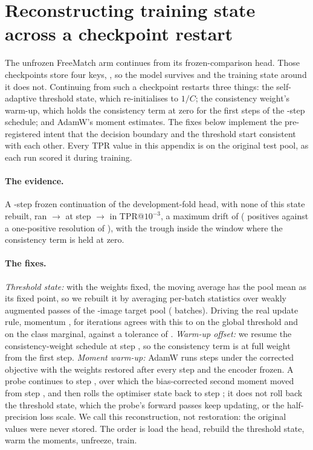 \section{Reconstructing training state across a checkpoint restart}
\label{sec:appendix-restart}

The unfrozen FreeMatch arm continues from its frozen-comparison head. Those checkpoints store
four keys, \restartKeys{}, so the model survives and the training state around it does not.
Continuing from such a checkpoint restarts three things: the self-adaptive threshold state,
which re-initialises to $1/C$; the consistency weight's warm-up, which holds the consistency term at
zero for the first \restartMuZeroSteps{} steps of the \restartScheduleStepsNs{}-step schedule;
and AdamW's moment estimates. The fixes below implement the pre-registered intent that the
decision boundary and the threshold start consistent with each other. Every TPR value in this
appendix is on the original test pool, as each run scored it during training.

\paragraph{The evidence.} A \restartControlStepsNs{}-step frozen continuation of the
development-fold head, with none of this state rebuilt, ran \restartStart{} $\to$
\restartTrough{} at step \restartTroughStep{} $\to$ \restartEnd{} in TPR@$10^{-3}$, a maximum
drift of \restartMaxDrift{} (\restartMaxDriftPos{} positives against a one-positive resolution
of \restartOnePos{}), with the trough inside the window where the consistency term is held at zero.

\paragraph{The fixes.} \emph{Threshold state:} with the weights fixed, the moving average has
the pool mean as its fixed point, so we rebuilt it by averaging per-batch statistics over
\restartSatPasses{} weakly augmented passes of the \restartPool{}-image target pool
(\restartSatBatches{} batches). Driving the real update rule, momentum \restartMomentum{}, for
\restartEmaItersNs{} iterations agrees with this to \restartTauAgree{} on the global threshold and
\restartPbarAgree{} on the class marginal, against a tolerance of \restartSatTol{}.
\emph{Warm-up offset:} we resume the consistency-weight schedule at step \restartMuOffsetNs{}, so
the consistency term is at full weight from the first step. \emph{Moment warm-up:} AdamW runs
\restartAdamSteps{} steps under the corrected objective with the weights restored after every
step and the encoder frozen. A probe continues to step \restartAdamProbeEnd{}, over which the
bias-corrected second moment moved \restartAdamDebiased{} from step \restartAdamSteps{}, and
then rolls the optimiser state back to step \restartAdamSteps{}; it does not roll back the
threshold state, which the probe's forward passes keep updating, or the half-precision loss
scale. We call this reconstruction, not restoration: the original values were never stored.
The order is load the head, rebuild the threshold state, warm the moments, unfreeze, train.

